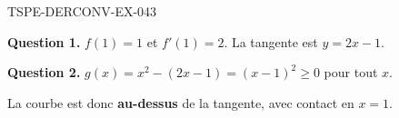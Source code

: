 \begin{corrige}{TSPE-DERCONV-EX-043}

\textbf{Question 1.} $f(1) = 1$ et $f'(1) = 2$. La tangente est $y = 2x - 1$.


\textbf{Question 2.} $g(x) = x^2 - (2x-1) = (x-1)^2 \geq 0$ pour tout $x$.

La courbe est donc \textbf{au-dessus} de la tangente, avec contact en $x = 1$.

\end{corrige}
